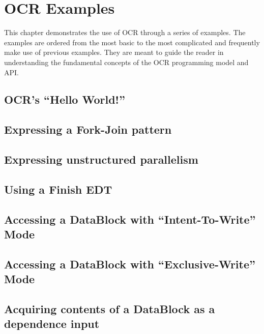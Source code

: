 

\chapter{OCR  Examples}
\label{chap:OCR Examples}
\label{chap:Appendix A}


This chapter demonstrates the use of OCR through a series of
examples. The examples are ordered from the most basic to the most
complicated and frequently make use of previous examples. They are
meant to guide the reader in understanding the fundamental concepts of
the OCR programming model and API.

\section{OCR's ``Hello World!''}

\section{Expressing a Fork-Join pattern}

\section{Expressing unstructured parallelism}

\section{Using a Finish EDT}

\section{Accessing a DataBlock with ``Intent-To-Write'' Mode}

\section{Accessing a DataBlock with ``Exclusive-Write'' Mode}

\section{Acquiring contents of a DataBlock as a dependence input}

